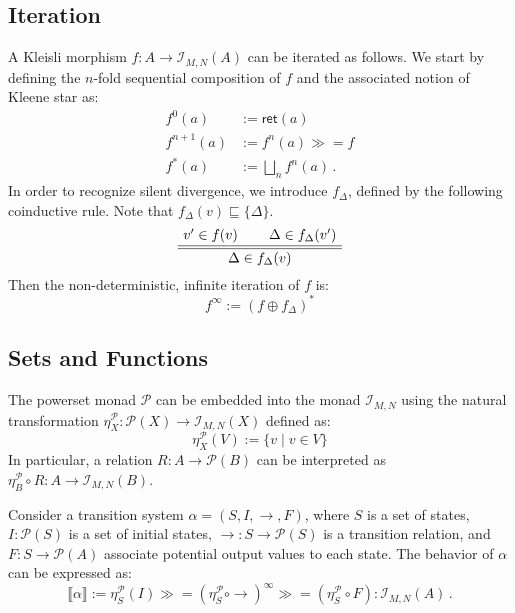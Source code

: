 \documentclass[acmsmall,timestamp,review]{acmart}
\newcommand{\kw}[1]{\ensuremath{ \mathsf{#1} }}
\newcommand{\bind}{\gg\!\!=}
\begin{document}

\subsection{Iteration} \label{sec:monad:iter} %

A Kleisli morphism $f : A \rightarrow \mathcal{I}_{M,N}(A)$
can be iterated as follows.
We start by defining
the $n$-fold sequential composition of $f$
and the associated notion of Kleene star as:
\begin{align*}
    f^0(a) &:= \kw{ret}(a) \\
    f^{n+1}(a) &:= f^n(a) \bind f \\
    f^*(a) &:= \bigsqcup_n f^n(a) \,.
\end{align*}
In order to recognize silent divergence,
we introduce $f_\Delta$,
defined by the following coinductive rule.
Note that $f_\Delta(v) \sqsubseteq \{\Delta\}$.
\[
    \AxiomC{$v' \in f(v)$}
    \AxiomC{$\Delta \in f_\Delta(v')$}
    \doubleLine
    \BinaryInfC{$\Delta \in f_\Delta(v)$}
    \DisplayProof
\]
Then the non-deterministic, infinite iteration of $f$ is:
\[
    f^\infty := (f \oplus f_\Delta)^*
\]


\subsection{Sets and Functions} \label{sec:monad:powerset} %

The powerset monad $\mathcal{P}$
can be embedded into the monad $\mathcal{I}_{M,N}$
using the natural transformation
$\eta^\mathcal{P}_X : \mathcal{P}(X) \rightarrow \mathcal{I}_{M,N}(X)$
defined as:
\[
    \eta^\mathcal{P}_X(V) := \{ v \mid v \in V \}
\]
In particular,
a relation $R : A \rightarrow \mathcal{P}(B)$
can be interpreted as
$\eta^\mathcal{P}_B \circ R : A \rightarrow \mathcal{I}_{M,N}(B)$.

\begin{example} \label{ex:ts} %
Consider a transition system $\alpha = (S, I, {\rightarrow}, F)$,
where
$S$ is a set of states,
$I : \mathcal{P}(S)$
is a set of initial states,
${\rightarrow} : S \rightarrow \mathcal{P}(S)$
is a transition relation, and
$F : S \rightarrow \mathcal{P}(A)$
associate potential output values to each state.
The behavior of $\alpha$ can be expressed as:
\[
    \llbracket \alpha \rrbracket :=
    \eta^\mathcal{P}_S(I) \bind
    (\eta^\mathcal{P}_S \circ {\rightarrow})^\infty \bind
    (\eta^\mathcal{P}_S \circ F)
    : \mathcal{I}_{M,N}(A) \,.
\]
\end{example}
\end{document}
